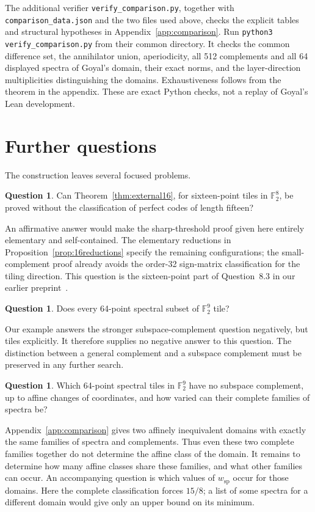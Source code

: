 \documentclass[11pt]{article}
\numberwithin{equation}{section}
\theoremstyle{definition}
\newtheorem{question}[theorem]{Question}
\theoremstyle{remark}\newtheorem{remark}[theorem]{Remark}
\newcommand{\F}{\mathbb F_2}
\newcommand{\wsp}{w_{\mathrm{sp}}}
\begin{document}
The additional verifier \texttt{verify\_comparison.py}, together with
\texttt{comparison\_data.json} and the two files used above, checks the
explicit tables and structural hypotheses in Appendix~\ref{app:comparison}.
Run \texttt{python3 verify\_comparison.py} from their common directory.
It checks the common difference set, the annihilator union, aperiodicity,
all 512 complements and all 64 displayed spectra of Goyal's domain,
their exact norms, and the layer-direction multiplicities distinguishing
the domains. Exhaustiveness follows from the theorem in the appendix.
These are exact Python checks, not a replay of Goyal's Lean development.

\section{Further questions}
The construction leaves several focused problems.
\begin{question}
Can Theorem~\ref{thm:external16}, for sixteen-point tiles in $\F^8$,
be proved without the classification of perfect codes of length fifteen?
\end{question}
An affirmative answer would make the sharp-threshold proof given here
entirely elementary and self-contained. The elementary reductions in
Proposition~\ref{prop:16reductions} specify the remaining configurations;
the small-complement proof already avoids the order-32 sign-matrix
classification for the tiling direction. This question is the sixteen-point
part of Question~8.3 in our earlier preprint~\cite{FI}.

\begin{question}
Does every 64-point spectral subset of $\F^9$ tile?
\end{question}
Our example answers the stronger subspace-complement question negatively,
but tiles explicitly. It therefore supplies no negative answer to this
question. The distinction between a general complement and a subspace
complement must be preserved in any further search.

\begin{question}
Which 64-point spectral tiles in $\F^9$ have no subspace complement,
up to affine changes of coordinates, and how varied can their complete
families of spectra be?
\end{question}
Appendix~\ref{app:comparison} gives two affinely inequivalent domains
with exactly the same families of spectra and complements. Thus even
these two complete families together do not determine the affine class
of the domain. It remains to determine how many affine classes share
these families, and what other families can occur.
An accompanying question is which values of $\wsp$ occur for those
domains. Here the complete classification forces $15/8$; a list of some
spectra for a different domain would give only an upper bound on its
minimum.
\end{document}
